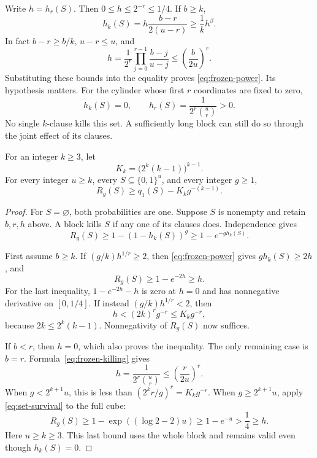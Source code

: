 Write \(h=h_r(S)\).  Then \(0\le h\le2^{-r}\le1/4\).  If \(b\ge k\),
\begin{equation}\label{eq:frozen-power}
 h_k(S)=h\frac{b-r}{2(u-r)}\ge\frac1k h^\beta.
\end{equation}
In fact \(b-r\ge b/k\), \(u-r\le u\), and
\[
 h=\frac1{2^r}\prod_{j=0}^{r-1}\frac{b-j}{u-j}
 \le \left(\frac b{2u}\right)^r.
\]
Substituting these bounds into the equality proves
\eqref{eq:frozen-power}.  Its hypothesis matters.  For the cylinder
whose first \(r\) coordinates are fixed to zero,
\begin{equation}\label{eq:frozen-exception}
 h_k(S)=0,\qquad h_r(S)=\frac1{2^r\binom ur}>0.
\end{equation}
No single \(k\)-clause kills this set.  A sufficiently long block
can still do so through the joint effect of its clauses.

\begin{lemma}\label{lem:one-replacement}
For an integer \(k\ge3\), let
\[
 K_k=\bigl(2^k(k-1)\bigr)^{k-1}.
\]
For every integer \(u\ge k\), every \(S\subseteq\{0,1\}^u\), and
every integer \(g\ge1\),
\begin{equation}\label{eq:one-replacement}
 R_g(S)\ge q_1(S)-K_k g^{-(k-1)}.
\end{equation}
\end{lemma}

\begin{proof}
For \(S=\varnothing\), both probabilities are one.  Suppose \(S\) is
nonempty and retain \(b,r,h\) above.  A block kills \(S\) if any
one of its clauses does.  Independence gives
\begin{equation}\label{eq:individual-block-bound}
 R_g(S)\ge1-(1-h_k(S))^g\ge1-e^{-g h_k(S)}.
\end{equation}

First assume \(b\ge k\).  If \((g/k)h^{1/r}\ge2\), then
\eqref{eq:frozen-power} gives \(g h_k(S)\ge2h\), and
\[
 R_g(S)\ge1-e^{-2h}\ge h.
\]
For the last inequality, \(1-e^{-2h}-h\) is zero at \(h=0\) and
has nonnegative derivative on \([0,1/4]\).  If instead
\((g/k)h^{1/r}<2\), then
\[
 h<(2k)^r g^{-r}\le K_k g^{-r},
\]
because \(2k\le2^k(k-1)\).  Nonnegativity of \(R_g(S)\) now suffices.

If \(b<r\), then \(h=0\), which also proves the inequality.  The only
remaining case is \(b=r\).  Formula~\eqref{eq:frozen-killing} gives
\[
 h=\frac1{2^r\binom ur}\le\left(\frac r{2u}\right)^r.
\]
When \(g<2^{k+1}u\), this is less than
\((2^k r/g)^r=K_k g^{-r}\).  When \(g\ge2^{k+1}u\), apply
\eqref{eq:set-survival} to the full cube:
\[
 R_g(S)\ge1-\exp((\log2-2)u)
 \ge1-e^{-u}>\frac14\ge h.
\]
Here \(u\ge k\ge3\).  This last bound uses the whole block and remains
valid even though \(h_k(S)=0\).
\end{proof}

